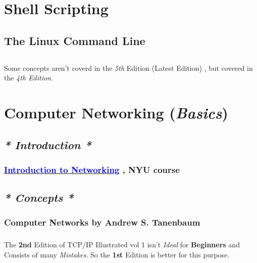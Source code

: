 \documentclass[12pt, a4paper]{article}
\begin{document}
\section{Shell Scripting}
\subsection*{The Linux Command Line}
\subsection*{}
\paragraph{}
Some concepts aren't coverd in the \emph{5th} Edition (Latest Edition) , but covered in the \emph{4th Edition}. 

\section{Computer Networking (\emph{Basics})}
\subsection*{\emph{* Introduction *}}
\subsubsection*{\href{https://www.edx.org/course/introduction-to-networking}{\textcolor{blue}{Introduction to Networking}} , NYU course}
\subsection*{\emph{* Concepts *}}
\subsubsection*{Computer Networks by Andrew S. Tanenbaum}
\subsubsection*{}
\paragraph{}
The \textbf{2nd} Edition of TCP/IP Illustrated vol 1 isn't \emph{Ideal} for \textbf{Beginners} and Consists of many \emph{Mistakes}. So the \textbf{1st} Edition is better for this purpose.
\end{document}
